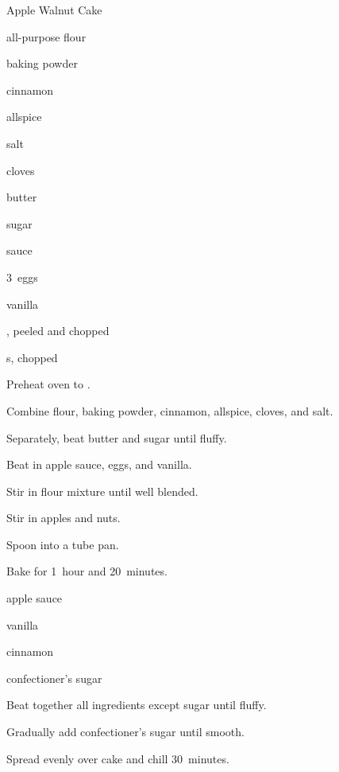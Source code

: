 \begin{recipe}{Apple Walnut Cake}{}{}

\begin{ingredients}
\item {} all-purpose flour
\item \tp{2\half} baking powder
\item \tp{1\half} cinnamon
\item \tp{\half} allspice
\item \tp{\half} salt
\item \tp{\quarter} cloves
\item \C{\threequarter} butter
\item \C{1\half} sugar
\item \C{1\half}  sauce
\item 3~eggs
\item {} vanilla
\item {} , peeled and chopped
\item \C{\twothird} s, chopped
\end{ingredients}

\begin{directions}
\item Preheat oven to .
\item Combine flour, baking powder, cinnamon, allspice, cloves, and salt.
\item Separately, beat butter and sugar until fluffy.
\item Beat in apple sauce, eggs, and vanilla.
\item Stir in flour mixture until well blended.
\item Stir in apples and nuts.
\item Spoon into a  tube pan.
\item Bake for 1~hour and 20~minutes.
\end{directions}

\begin{ingredients}
\item {} 
\item {} apple sauce
\item {} vanilla
\item \tp{\quarter} cinnamon
\item \C{4\half} confectioner's sugar
\end{ingredients}

\begin{directions}
\item Beat together all ingredients except sugar until fluffy.
\item Gradually add confectioner's sugar until smooth.
\item Spread evenly over cake and chill 30~minutes.
\end{directions}

\end{recipe}
